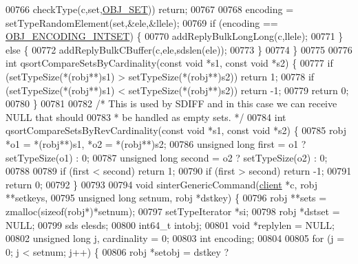 \begin{DoxyCode}
00766         checkType(c,set,\hyperlink{server_8h_a8d179375a4aac33d3fa7aa80c8ccc75f}{OBJ\_SET})) \textcolor{keywordflow}{return};
00767 
00768     encoding = setTypeRandomElement(set,&ele,&llele);
00769     \textcolor{keywordflow}{if} (encoding == \hyperlink{server_8h_a214173987de21c3b7661fddd42b05873}{OBJ\_ENCODING\_INTSET}) \{
00770         addReplyBulkLongLong(c,llele);
00771     \} \textcolor{keywordflow}{else} \{
00772         addReplyBulkCBuffer(c,ele,sdslen(ele));
00773     \}
00774 \}
00775 
00776 \textcolor{keywordtype}{int} qsortCompareSetsByCardinality(\textcolor{keyword}{const} \textcolor{keywordtype}{void} *s1, \textcolor{keyword}{const} \textcolor{keywordtype}{void} *s2) \{
00777     \textcolor{keywordflow}{if} (setTypeSize(*(robj**)s1) > setTypeSize(*(robj**)s2)) \textcolor{keywordflow}{return} 1;
00778     \textcolor{keywordflow}{if} (setTypeSize(*(robj**)s1) < setTypeSize(*(robj**)s2)) \textcolor{keywordflow}{return} -1;
00779     \textcolor{keywordflow}{return} 0;
00780 \}
00781 
00782 \textcolor{comment}{/* This is used by SDIFF and in this case we can receive NULL that should}
00783 \textcolor{comment}{ * be handled as empty sets. */}
00784 \textcolor{keywordtype}{int} qsortCompareSetsByRevCardinality(\textcolor{keyword}{const} \textcolor{keywordtype}{void} *s1, \textcolor{keyword}{const} \textcolor{keywordtype}{void} *s2) \{
00785     robj *o1 = *(robj**)s1, *o2 = *(robj**)s2;
00786     \textcolor{keywordtype}{unsigned} \textcolor{keywordtype}{long} first = o1 ? setTypeSize(o1) : 0;
00787     \textcolor{keywordtype}{unsigned} \textcolor{keywordtype}{long} second = o2 ? setTypeSize(o2) : 0;
00788 
00789     \textcolor{keywordflow}{if} (first < second) \textcolor{keywordflow}{return} 1;
00790     \textcolor{keywordflow}{if} (first > second) \textcolor{keywordflow}{return} -1;
00791     \textcolor{keywordflow}{return} 0;
00792 \}
00793 
00794 \textcolor{keywordtype}{void} sinterGenericCommand(\hyperlink{structclient}{client} *c, robj **setkeys,
00795                           \textcolor{keywordtype}{unsigned} \textcolor{keywordtype}{long} setnum, robj *dstkey) \{
00796     robj **sets = zmalloc(\textcolor{keyword}{sizeof}(robj*)*setnum);
00797     setTypeIterator *si;
00798     robj *dstset = NULL;
00799     sds elesds;
00800     int64\_t intobj;
00801     \textcolor{keywordtype}{void} *replylen = NULL;
00802     \textcolor{keywordtype}{unsigned} \textcolor{keywordtype}{long} j, cardinality = 0;
00803     \textcolor{keywordtype}{int} encoding;
00804 
00805     \textcolor{keywordflow}{for} (j = 0; j < setnum; j++) \{
00806         robj *setobj = dstkey ?

\end{DoxyCode}
